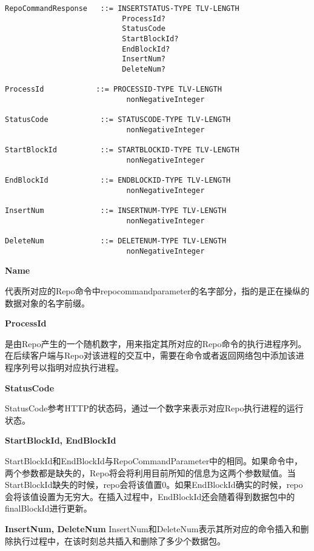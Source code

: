 \begin{framed}
\begin{footnotesize}
\begin{verbatim}
RepoCommandResponse   ::= INSERTSTATUS-TYPE TLV-LENGTH
                           ProcessId?
                           StatusCode
                           StartBlockId?
                           EndBlockId?
                           InsertNum?
                           DeleteNum?

ProcessId            ::= PROCESSID-TYPE TLV-LENGTH
                            nonNegativeInteger 

StatusCode            ::= STATUSCODE-TYPE TLV-LENGTH
                            nonNegativeInteger    

StartBlockId          ::= STARTBLOCKID-TYPE TLV-LENGTH
                            nonNegativeInteger

EndBlockId            ::= ENDBLOCKID-TYPE TLV-LENGTH
                            nonNegativeInteger

InsertNum             ::= INSERTNUM-TYPE TLV-LENGTH
                            nonNegativeInteger

DeleteNum             ::= DELETENUM-TYPE TLV-LENGTH
                            nonNegativeInteger
\end{verbatim}
\end{footnotesize}
\end{framed}

\textbf{Name}

代表所对应的Repo命令中repocommandparameter的名字部分，指的是正在操纵的数据对象的名字前缀。

\textbf{ProcessId}

是由Repo产生的一个随机数字，用来指定其所对应的Repo命令的执行进程序列。在后续客户端与Repo对该进程的交互中，需要在命令或者返回网络包中添加该进程序列号以指明对应执行进程。

\textbf{StatusCode}

StatusCode参考HTTP的状态码，通过一个数字来表示对应Repo执行进程的运行状态。

\textbf{StartBlockId, EndBlockId}

StartBlockId和EndBlockId与RepoCommandParameter中的相同。如果命令中，两个参数都是缺失的，Repo将会将利用目前所知的信息为这两个参数赋值。当StartBlockId缺失的时候，repo会将该值置0。如果EndBlockId确实的时候，repo会将该值设置为无穷大。在插入过程中，EndBlockId还会随着得到数据包中的finalBlockId进行更新。

\textbf{InsertNum, DeleteNum}
InsertNum和DeleteNum表示其所对应的命令插入和删除执行过程中，在该时刻总共插入和删除了多少个数据包。


